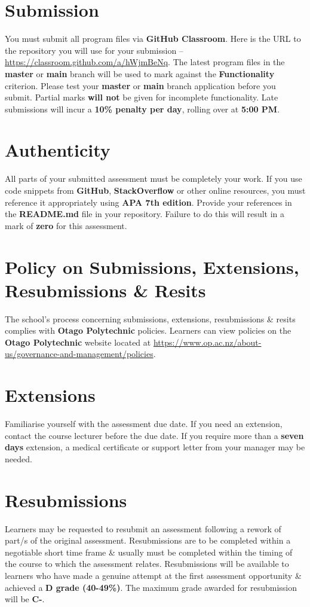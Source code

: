 \documentclass{article}
\begin{document}
\section*{Submission}
You must submit all program files via \textbf{GitHub Classroom}. Here is the URL to the repository you will use for your submission – \href{https://classroom.github.com/a/hWjmBeNq}{https://classroom.github.com/a/hWjmBeNq}. The latest program files in the \textbf{master} or \textbf{main} branch will be used to mark against the \textbf{Functionality} criterion. Please test your \textbf{master} or \textbf{main} branch application before you submit. Partial marks \textbf{will not} be given for incomplete functionality. Late submissions will incur a \textbf{10\% penalty per day}, rolling over at \textbf{5:00 PM}.

\section*{Authenticity}
All parts of your submitted assessment must be completely your work. If you use code snippets from \textbf{GitHub}, \textbf{StackOverflow} or other online resources, you must reference it appropriately using \textbf{APA 7th edition}. Provide your references in the \textbf{README.md} file in your repository. Failure to do this will result in a mark of \textbf{zero} for this assessment.

\section*{Policy on Submissions, Extensions, Resubmissions \& Resits}
The school's process concerning submissions, extensions, resubmissions \& resits complies with \textbf{Otago Polytechnic} policies. Learners can view policies on the \textbf{Otago Polytechnic} website located at \href{https://www.op.ac.nz/about-us/governance-and-management/policies}{https://www.op.ac.nz/about-us/governance-and-management/policies}.

\section*{Extensions}
Familiarise yourself with the assessment due date. If you need an extension, contact the course lecturer before the due date. If you require more than a \textbf{seven days} extension, a medical certificate or support letter from your manager may be needed.

\section*{Resubmissions}
Learners may be requested to resubmit an assessment following a rework of part/s of the original assessment. Resubmissions are to be completed within a negotiable short time frame \& usually must be completed within the timing of the course to which the assessment relates. Resubmissions will be available to learners who have made a genuine attempt at the first assessment opportunity \& achieved a \textbf{D grade (40-49\%)}. The maximum grade awarded for resubmission will be \textbf{C-}.
\end{document}
